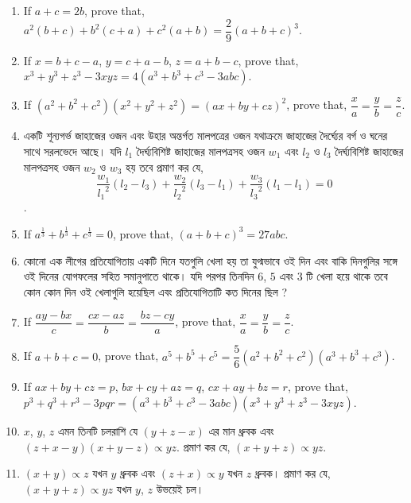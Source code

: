 \documentclass[11pt, a4paper]{article}
\begin{document}
\begin{enumerate}
	\item If $a+c=2b$, prove that, $a^2(b+c)+b^2(c+a)+c^2(a+b)=\dfrac{2}{9}(a+b+c)^3$.
	
	\item If $x=b+c-a$, $y=c+a-b$, $z=a+b-c$, prove that, $x^3+y^3+z^3-3xyz = 4(a^3+b^3+c^3-3abc)$.

	\item If $(a^2+b^2+c^2)(x^2+y^2+z^2) = (ax+by+cz)^2$, prove that, $\dfrac{x}{a} = \dfrac{y}{b} = \dfrac{z}{c}$.
	
	\item \textbengali{একটি শূন্যগর্ভ জাহাজের ওজন এবং উহার অন্তর্গত মালপত্রের ওজন যথাক্রমে জাহাজের দৈর্ঘ্যের বর্গ ও ঘনের সাথে সরলভেদে আছে। যদি} $l_1$ \textbengali{দৈর্ঘ্যবিশিষ্ট জাহাজের মালপত্রসহ ওজন} $w_1$ \textbengali{এবং} $l_2$ \textbengali{ও} $l_3$ \textbengali{দৈর্ঘ্যবিশিষ্ট জাহাজের মালপত্রসহ ওজন} $w_2$ \textbengali{ও} $w_3$ \textbengali{হয় তবে প্রমাণ কর যে,} $$\dfrac{w_1}{{l_1}^2}\left( l_2 - l_3 \right) + \dfrac{w_2}{{l_2}^2}\left( l_3 - l_1 \right) + \dfrac{w_3}{{l_3}^2}\left( l_1 - l_1 \right) = 0$$.
	
	\item If $a^{\frac{1}{3}} + b^{\frac{1}{3}} + c^{\frac{1}{3}} = 0$, prove that, $(a+b+c)^3 = 27abc$.
	
	\item \textbengali{কোনো এক লীগের প্রতিযোগিতায় একটি দিনে যতগুলি খেলা হয় তা যুগ্মভাবে ওই দিন এবং বাকি দিনগুলির সঙ্গে ওই দিনের যোগফলের সহিত সমানুপাতে থাকে। যদি পরপর তিনদিন } $6$, $5$ \textbengali{এবং} $3$ \textbengali{টি খেলা হয়ে থাকে তবে কোন কোন দিন ওই খেলাগুলি হয়েছিল এবং প্রতিযোগিতাটি কত দিনের ছিল ?}
	
	\item If $\dfrac{ay-bx}{c} = \dfrac{cx-az}{b} = \dfrac{bz-cy}{a}$, prove that, $\dfrac{x}{a} = \dfrac{y}{b} = \dfrac{z}{c}$.
	
	\item If $a+b+c=0$, prove that, $a^5 + b^5 + c^5 = \dfrac{5}{6} (a^2 + b^2 + c^2) (a^3 + b^3 + c^3)$.
	
	\item If $ax+by+cz=p$, $bx+cy+az=q$, $cx+ay+bz=r$, prove that, $p^3+q^3+r^3-3pqr = (a^3+b^3+c^3-3abc)(x^3+y^3+z^3-3xyz)$.
	
	\item $x$, $y$, $z$ \textbengali{এমন তিনটি চলরাশি যে} $(y+z-x)$ \textbengali{এর মান ধ্রুবক এবং} $(z+x-y)(x+y-z)\propto yz$. \textbengali{প্রমাণ কর যে,} $(x+y+z) \propto yz$.
	
	\item $(x+y) \propto z$ \textbengali{যখন} $y$ \textbengali{ধ্রুবক এবং} $(z+x) \propto y$ \textbengali{যখন} $z$ \textbengali{ধ্রুবক। প্রমাণ কর যে,} $(x+y+z) \propto yz$ \textbengali{যখন} $y$, $z$ \textbengali{উভয়েই চল।}
	

\end{enumerate}
\end{document}
